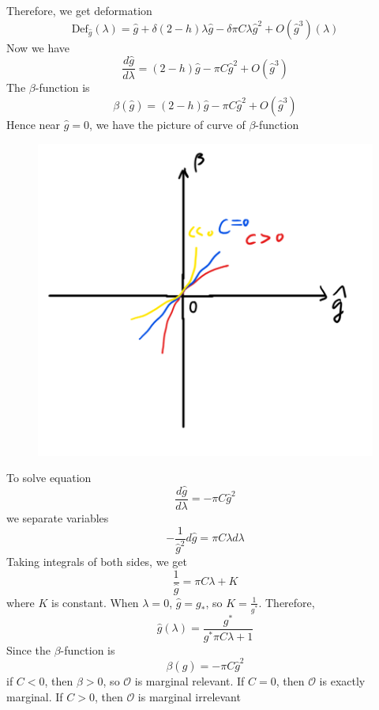 Therefore, we get deformation
\begin{equation}
	\text{Def}_{\hat{g}}(\lambda) = \hat{g} + \delta(2-h) \lambda \hat{g} - \delta \pi C \lambda \hat{g}^2 + O(\hat{g}^3)(\lambda)
\end{equation}
Now we have 
\begin{equation}
	\frac{d \hat{g}}{d\lambda} = (2-h) \hat{g} - \pi C \hat{g}^2 + O(\hat{g}^3)
\end{equation}
The $\beta$-function is 
\[
\beta(\hat{g}) = (2-h) \hat{g} - \pi C \hat{g}^2 + O(\hat{g}^3)
\]
Hence near $\hat{g}=0$, we have the picture of curve of $\beta$-function
\begin{figure}[h]
	\centering\includegraphics[scale=0.5]{PIC/hw8pic1.png}
\end{figure}
To solve equation
\begin{equation}
	\frac{d\hat{g}}{d\lambda} = - \pi C \hat{g}^2
\end{equation}
we separate variables
\[
- \frac{1}{\hat{g}^2} d \hat{g} = \pi C \lambda d\lambda
\]
Taking integrals of both sides, we get
\begin{equation}
\frac{1}{\hat{g}} = \pi C\lambda +K
\end{equation}
where $K$ is constant. When $\lambda=0$, $\hat{g} = g_*$, so $K = \frac{1}{g^*}$. Therefore,
\[
\hat{g}(\lambda) = \frac{g^*}{g^* \pi C \lambda +1}
\]
Since the $\beta$-function is
\[ 
\beta(\hat{g}) = - \pi C \hat{g}^2
\]
if $C < 0$, then $\beta > 0$, so $\mathcal{O}$ is marginal relevant. If $C=0$, then $\mathcal{O}$ is exactly marginal. If $C > 0$, then $\mathcal{O}$ is marginal irrelevant
